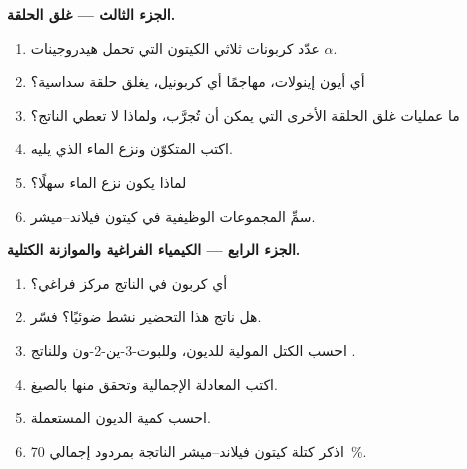 \begin{problem}
\medskip
\noindent\textbf{الجزء الثالث --- غلق الحلقة.}
\begin{enumerate}[resume]
  \item عدّد كربونات ثلاثي الكيتون التي تحمل هيدروجينات $\alpha$.
  \item أي أيون إينولات، مهاجمًا أي كربونيل، يغلق حلقة سداسية؟
  \item ما عمليات غلق الحلقة الأخرى التي يمكن أن تُجرَّب، ولماذا لا تعطي الناتج؟
  \item اكتب  المتكوّن ونزع الماء الذي يليه.
  \item لماذا يكون نزع الماء سهلًا؟
  \item سمِّ المجموعات الوظيفية في كيتون فيلاند--ميشر.
\end{enumerate}

\medskip
\noindent\textbf{الجزء الرابع --- الكيمياء الفراغية والموازنة الكتلية.}
\begin{enumerate}[resume]
  \item أي كربون في الناتج مركز فراغي؟
  \item هل ناتج هذا التحضير نشط ضوئيًا؟ فسّر.
  \item احسب الكتل المولية للديون، وللبوت-3-ين-2-ون وللناتج
        .
  \item اكتب المعادلة الإجمالية وتحقق منها بالصيغ.
  \item احسب كمية الديون المستعملة.
  \item اذكر كتلة كيتون فيلاند--ميشر الناتجة بمردود إجمالي 70~\%.
\end{enumerate}
\end{problem}
